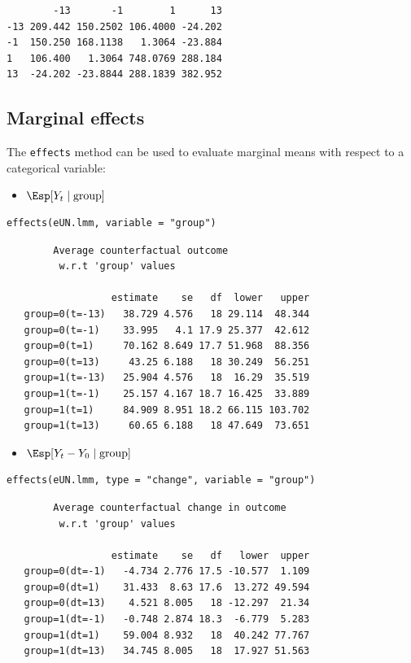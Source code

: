 \documentclass[12pt]{article}
\begin{document}
\begin{verbatim}
        -13       -1        1      13
-13 209.442 150.2502 106.4000 -24.202
-1  150.250 168.1138   1.3064 -23.884
1   106.400   1.3064 748.0769 288.184
13  -24.202 -23.8844 288.1839 382.952
\end{verbatim}


\clearpage

\subsection{Marginal effects}
\label{sec:org138be79}

The \texttt{effects} method can be used to evaluate marginal means with
respect to a categorical variable:
\begin{itemize}
\item \(\Esp[Y_t \mid \text{group}]\)
\end{itemize}
\lstset{language=r,label= ,caption= ,captionpos=b,numbers=none}
\begin{lstlisting}
effects(eUN.lmm, variable = "group")
\end{lstlisting}

\begin{verbatim}
		Average counterfactual outcome
		 w.r.t 'group' values 

                  estimate    se   df  lower   upper
   group=0(t=-13)   38.729 4.576   18 29.114  48.344
   group=0(t=-1)    33.995   4.1 17.9 25.377  42.612
   group=0(t=1)     70.162 8.649 17.7 51.968  88.356
   group=0(t=13)     43.25 6.188   18 30.249  56.251
   group=1(t=-13)   25.904 4.576   18  16.29  35.519
   group=1(t=-1)    25.157 4.167 18.7 16.425  33.889
   group=1(t=1)     84.909 8.951 18.2 66.115 103.702
   group=1(t=13)     60.65 6.188   18 47.649  73.651
\end{verbatim}

\begin{itemize}
\item \(\Esp[Y_t-Y_0 \mid \text{group}]\)
\end{itemize}
\lstset{language=r,label= ,caption= ,captionpos=b,numbers=none}
\begin{lstlisting}
effects(eUN.lmm, type = "change", variable = "group")
\end{lstlisting}

\begin{verbatim}
		Average counterfactual change in outcome
		 w.r.t 'group' values 

                  estimate    se   df   lower  upper
   group=0(dt=-1)   -4.734 2.776 17.5 -10.577  1.109
   group=0(dt=1)    31.433  8.63 17.6  13.272 49.594
   group=0(dt=13)    4.521 8.005   18 -12.297  21.34
   group=1(dt=-1)   -0.748 2.874 18.3  -6.779  5.283
   group=1(dt=1)    59.004 8.932   18  40.242 77.767
   group=1(dt=13)   34.745 8.005   18  17.927 51.563
\end{verbatim}
\end{document}
